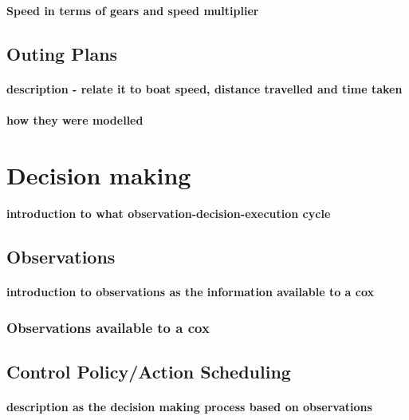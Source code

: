         \paragraph{Speed in terms of gears and speed multiplier}
        

    
    \subsection{Outing Plans}
      \paragraph{description - relate it to boat speed, distance travelled and time taken}
      \paragraph{how they were modelled}
    
  \section{Decision making}
    \paragraph{introduction to what observation-decision-execution cycle}

    \subsection{Observations}
      \paragraph{introduction to observations as the information available to a cox}
      
      \subsubsection{Observations available to a cox}
      
    \subsection{Control Policy/Action Scheduling}
      \paragraph{description as the decision making process based on observations}

